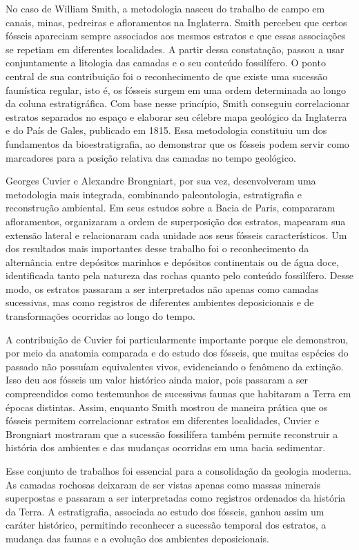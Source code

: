 \documentclass[a4paper,12pt]{article}
\theoremstyle{definition}
\theoremstyle{definition}
\theoremstyle{definition}
\begin{document}
No caso de William Smith, a metodologia nasceu do trabalho de campo em canais, minas, pedreiras e afloramentos na Inglaterra. Smith percebeu que certos fósseis apareciam sempre associados aos mesmos estratos e que essas associações se repetiam em diferentes localidades. A partir dessa constatação, passou a usar conjuntamente a litologia das camadas e o seu conteúdo fossilífero. O ponto central de sua contribuição foi o reconhecimento de que existe uma sucessão faunística regular, isto é, os fósseis surgem em uma ordem determinada ao longo da coluna estratigráfica. Com base nesse princípio, Smith conseguiu correlacionar estratos separados no espaço e elaborar seu célebre mapa geológico da Inglaterra e do País de Gales, publicado em 1815. Essa metodologia constituiu um dos fundamentos da bioestratigrafia, ao demonstrar que os fósseis podem servir como marcadores para a posição relativa das camadas no tempo geológico.

Georges Cuvier e Alexandre Brongniart, por sua vez, desenvolveram uma metodologia mais integrada, combinando paleontologia, estratigrafia e reconstrução ambiental. Em seus estudos sobre a Bacia de Paris, compararam afloramentos, organizaram a ordem de superposição dos estratos, mapearam sua extensão lateral e relacionaram cada unidade aos seus fósseis característicos. Um dos resultados mais importantes desse trabalho foi o reconhecimento da alternância entre depósitos marinhos e depósitos continentais ou de água doce, identificada tanto pela natureza das rochas quanto pelo conteúdo fossilífero. Desse modo, os estratos passaram a ser interpretados não apenas como camadas sucessivas, mas como registros de diferentes ambientes deposicionais e de transformações ocorridas ao longo do tempo.

A contribuição de Cuvier foi particularmente importante porque ele demonstrou, por meio da anatomia comparada e do estudo dos fósseis, que muitas espécies do passado não possuíam equivalentes vivos, evidenciando o fenômeno da extinção. Isso deu aos fósseis um valor histórico ainda maior, pois passaram a ser compreendidos como testemunhos de sucessivas faunas que habitaram a Terra em épocas distintas. Assim, enquanto Smith mostrou de maneira prática que os fósseis permitem correlacionar estratos em diferentes localidades, Cuvier e Brongniart mostraram que a sucessão fossilífera também permite reconstruir a história dos ambientes e das mudanças ocorridas em uma bacia sedimentar.

Esse conjunto de trabalhos foi essencial para a consolidação da geologia moderna. As camadas rochosas deixaram de ser vistas apenas como massas minerais superpostas e passaram a ser interpretadas como registros ordenados da história da Terra. A estratigrafia, associada ao estudo dos fósseis, ganhou assim um caráter histórico, permitindo reconhecer a sucessão temporal dos estratos, a mudança das faunas e a evolução dos ambientes deposicionais.
\end{document}
